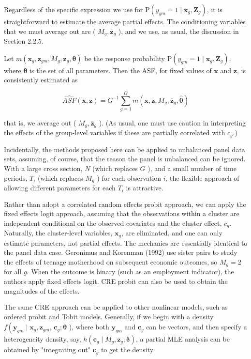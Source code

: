 \documentclass[10pt]{article}
\begin{document}
Regardless of the specific expression we use for $\mathrm{P}\left(y_{g m}=1 \mid \mathbf{x}_{g}, \mathbf{Z}_{g}\right)$, it is straightforward to estimate the average partial effects. The conditioning variables that we must average out are ( $M_{g}, \overline{\mathbf{z}}_{g}$ ), and we use, as usual, the discussion in Section 2.2.5.

Let $m\left(\mathbf{x}_{g}, \mathbf{z}_{g m}, M_{g}, \overline{\mathbf{z}}_{g}, \boldsymbol{\theta}\right)$ be the response probability $\mathrm{P}\left(y_{g m}=1 \mid \mathbf{x}_{g}, \mathbf{Z}_{g}\right)$, where $\boldsymbol{\theta}$ is the set of all parameters. Then the ASF, for fixed values of $\mathbf{x}$ and $\mathbf{z}$, is consistently estimated as


\begin{equation*}
\widehat{A S F}(\mathbf{x}, \mathbf{z})=G^{-1} \sum_{g=1}^{G} m\left(\mathbf{x}, \mathbf{z}, M_{g}, \overline{\mathbf{z}}_{g}, \hat{\boldsymbol{\theta}}\right) \tag{20.48}
\end{equation*}


that is, we average out ( $M_{g}, \overline{\mathbf{z}}_{g}$ ). (As usual, one must use caution in interpreting the effects of the group-level variables if these are partially correlated with $c_{g}$.)

Incidentally, the methods proposed here can be applied to unbalanced panel data sets, assuming, of course, that the reason the panel is unbalanced can be ignored. With a large cross section, $N$ (which replaces $G$ ), and a small number of time periods, $T_{i}$ (which replaces $M_{g}$ ) for each observation $i$, the flexible approach of allowing different parameters for each $T_{i}$ is attractive.

Rather than adopt a correlated random effects probit approach, we can apply the fixed effects logit approach, assuming that the observations within a cluster are independent conditional on the observed covariates and the cluster effect, $c_{g}$. Naturally, the cluster-level variables, $\mathbf{x}_{g}$, are eliminated, and one can only estimate parameters, not partial effects. The mechanics are essentially identical to the panel data case. Geronimus and Korenman (1992) use sister pairs to study the effects of teenage motherhood on subsequent economic outcomes, so $M_{g}=2$ for all $g$. When the outcome is binary (such as an employment indicator), the authors apply fixed effects logit. CRE probit can also be used to obtain the magnitudes of the effects.

The same CRE approach can be applied to other nonlinear models, such as ordered probit and Tobit models. Generally, if we begin with a density $f\left(\mathbf{y}_{g m} \mid \mathbf{x}_{g}, \mathbf{z}_{g m}\right.$, $\mathbf{c}_{g} ; \boldsymbol{\theta}$ ), where both $\mathbf{y}_{g m}$ and $\mathbf{c}_{g}$ can be vectors, and then specify a heterogeneity density, say, $h\left(\mathbf{c}_{g} \mid M_{g}, \overline{\mathbf{z}}_{g} ; \boldsymbol{\delta}\right)$, a partial MLE analysis can be obtained by "integrating out" $\mathbf{c}_{g}$ to get the density
\end{document}
